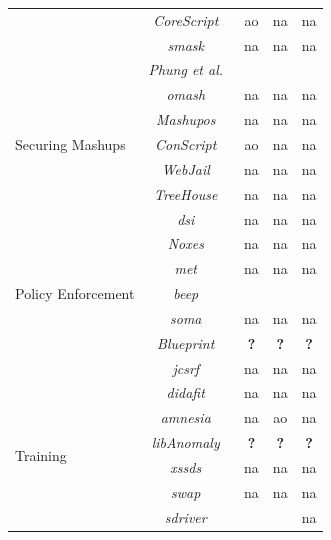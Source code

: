 \documentclass[conference]{IEEEtran}
\newcommand{\tick}{\ding{52}}
\begin{document}
\begin{table}
\begin{threeparttable}
\begin{small}
{\begin{tabular}{l|c|ccc}
  &   {\it CoreScript}~\cite{YCIS07} & {\sc ao} & {\sc na} & {\sc na} \\
  &   {\it {\sc sm}ask}~\cite{JB07} & {\sc na} & {\sc na} & {\sc na} \\
  &   {\it Phung et al.}~\cite{PSC09} & \tick & \tick & \tick \\
  \hline
  \hline 
  \multirow{5}{*}{Securing Mashups}
  &   {\it {\sc om}ash}~\cite{CHC08} & {\sc na} & {\sc na} & {\sc na} \\
  &   {\it Mashup{\sc os}}~\cite{WFHJ07} & {\sc na} & {\sc na} & {\sc na} \\
  &   {\it ConScript}~\cite{ML10} & {\sc ao} & {\sc na} & {\sc na} \\
  &   {\it WebJail}~\cite{VDDPJ11} & {\sc na} & {\sc na} & {\sc na} \\
  &   {\it TreeHouse}~\cite{IW12} & {\sc na} & {\sc na} & {\sc na} \\
  \hline
  \hline
	\multirow{7}{*}{Policy Enforcement}
	&   {\it {\sc dsi}}~\cite{NSS06} & {\sc na} & {\sc na} & {\sc na} \\
  &   {\it Noxes}~\cite{KKVJ06,KJKV09}  & {\sc na} & {\sc na} & {\sc na} \\
	&   {\it {\sc met}}~\cite{ELX07} & {\sc na} & {\sc na} & {\sc na} \\
  &   {\it {\sc beep}}~\cite{TNH07} & \tick & \tick & \tick \\
  &   {\it {\sc soma}}~\cite{OWVS08} & {\sc na} & {\sc na} & {\sc na} \\
	&   {\it Blueprint}~\cite{LV09} & {\bf ?} & {\bf ?} & {\bf ?} \\
	&   {\it j{\sc csrf}}~\cite{PS11} & {\sc na} & {\sc na} & {\sc na} \\
	\hline
	\hline  
        \multirow{7}{*}{Training}
  &   {\it {\sc didafit}}~\cite{LLW02} & {\sc na} & {\sc na} & {\sc na} \\
	&   {\it {\sc amnesia}}~\cite{HO05,HO06,HO05b} & {\sc na} & {\sc ao} & {\sc na} \\
	&   {\it libAnomaly}~\cite{VMV05} & {\bf ?} & {\bf ?} & {\bf ?} \\
	& 	{\it {\sc xssds}}~\cite{JEP08} & {\sc na} & {\sc na} & {\sc na} \\
  & 	{\it {\sc swap}}~\cite{WPLKK09} & {\sc na} & {\sc na} & {\sc na} \\
	& 	{\it {\sc sd}river}~\cite{MS09,MKS09,MKLS11} & \tick & \tick & {\sc na} \\

\end{tabular}}
\end{small}
\end{threeparttable}
\end{table}
\end{document}
